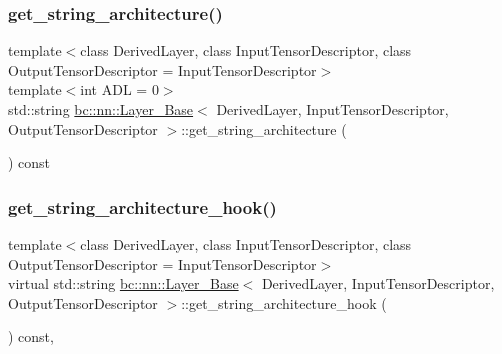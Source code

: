 \mbox{\label{structbc_1_1nn_1_1Layer__Base_ac29ced9ec2212afd843d87b8b661c036}} 
\subsubsection{\texorpdfstring{get\+\_\+string\+\_\+architecture()}{get\_string\_architecture()}}
{\footnotesize\ttfamily template$<$class Derived\+Layer, class Input\+Tensor\+Descriptor, class Output\+Tensor\+Descriptor = Input\+Tensor\+Descriptor$>$ \\
template$<$int A\+DL = 0$>$ \\
std\+::string \hyperlink{structbc_1_1nn_1_1Layer__Base}{bc\+::nn\+::\+Layer\+\_\+\+Base}$<$ Derived\+Layer, Input\+Tensor\+Descriptor, Output\+Tensor\+Descriptor $>$\+::get\+\_\+string\+\_\+architecture (\begin{DoxyParamCaption}{ }\end{DoxyParamCaption}) const\hspace{0.3cm}{\ttfamily [inline]}}

\mbox{\label{structbc_1_1nn_1_1Layer__Base_a0a1ff093d24d00868bc42419f75f181a}} 
\subsubsection{\texorpdfstring{get\+\_\+string\+\_\+architecture\+\_\+hook()}{get\_string\_architecture\_hook()}}
{\footnotesize\ttfamily template$<$class Derived\+Layer, class Input\+Tensor\+Descriptor, class Output\+Tensor\+Descriptor = Input\+Tensor\+Descriptor$>$ \\
virtual std\+::string \hyperlink{structbc_1_1nn_1_1Layer__Base}{bc\+::nn\+::\+Layer\+\_\+\+Base}$<$ Derived\+Layer, Input\+Tensor\+Descriptor, Output\+Tensor\+Descriptor $>$\+::get\+\_\+string\+\_\+architecture\+\_\+hook (\begin{DoxyParamCaption}{ }\end{DoxyParamCaption}) const\hspace{0.3cm}{\ttfamily [inline]}, {\ttfamily [virtual]}}

